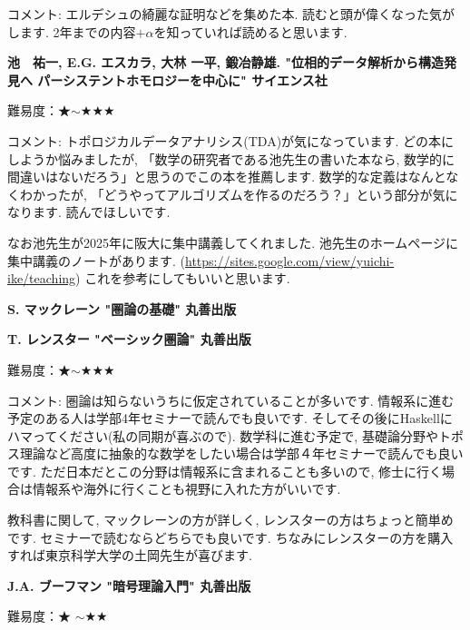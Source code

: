 コメント: エルデシュの綺麗な証明などを集めた本. 読むと頭が偉くなった気がします. 
2年までの内容$+\alpha$を知っていれば読めると思います.  
\vspace{8pt}

\textbf{池　祐一, E.G. エスカラ, 大林 一平, 鍛冶静雄. "位相的データ解析から構造発見へ パーシステントホモロジーを中心に" サイエンス社}  　\vspace{-6pt} 

難易度：★$\sim$★★★\vspace{-6pt} 

コメント: トポロジカルデータアナリシス(TDA)が気になっています. どの本にしようか悩みましたが, 「数学の研究者である池先生の書いた本なら, 数学的に間違いはないだろう」と思うのでこの本を推薦します. 数学的な定義はなんとなくわかったが, 「どうやってアルゴリズムを作るのだろう？」という部分が気になります. 読んでほしいです. 

なお池先生が2025年に阪大に集中講義してくれました. 池先生のホームページに集中講義のノートがあります. (\url{https://sites.google.com/view/yuichi-ike/teaching}) これを参考にしてもいいと思います. 
\vspace{8pt}

\textbf{S. マックレーン "圏論の基礎" 丸善出版}  　\vspace{-6pt} 

\textbf{T. レンスター "ベーシック圏論" 丸善出版}  　\vspace{-6pt} 

難易度：★$\sim$★★★ \vspace{-6pt} 

コメント: 圏論は知らないうちに仮定されていることが多いです. 情報系に進む予定のある人は学部4年セミナーで読んでも良いです.  そしてその後にHaskellにハマってください(私の同期が喜ぶので). 数学科に進む予定で, 基礎論分野やトポス理論など高度に抽象的な数学をしたい場合は学部４年セミナーで読んでも良いです. ただ日本だとこの分野は情報系に含まれることも多いので, 修士に行く場合は情報系や海外に行くことも視野に入れた方がいいです. 

教科書に関して, マックレーンの方が詳しく, レンスターの方はちょっと簡単めです. セミナーで読むならどちらでも良いです. ちなみにレンスターの方を購入すれば東京科学大学の土岡先生が喜びます. 
\vspace{8pt}

\textbf{J.A. ブーフマン "暗号理論入門" 丸善出版}  　\vspace{-6pt} 

難易度：★ $\sim$★★\vspace{-6pt} 

